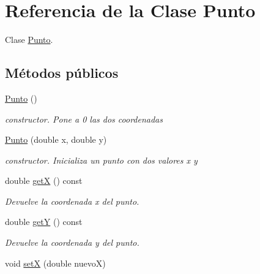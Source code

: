 \hypertarget{classPunto}{}\section{Referencia de la Clase Punto}
\label{classPunto}


Clase \hyperlink{classPunto}{Punto}.  


\subsection*{Métodos públicos}
\begin{DoxyCompactItemize}
\item 
\hyperlink{classPunto_a4b8b70b933ff13493ee5ddb3c8532c10}{Punto} ()\hypertarget{classPunto_a4b8b70b933ff13493ee5ddb3c8532c10}{}\label{classPunto_a4b8b70b933ff13493ee5ddb3c8532c10}

\begin{DoxyCompactList}\small\item\em constructor. Pone a 0 las dos coordenadas \end{DoxyCompactList}\item 
\hyperlink{classPunto_a911bb8d88eaa1f9904a27b0e159a51c0}{Punto} (double x, double y)\hypertarget{classPunto_a911bb8d88eaa1f9904a27b0e159a51c0}{}\label{classPunto_a911bb8d88eaa1f9904a27b0e159a51c0}

\begin{DoxyCompactList}\small\item\em constructor. Inicializa un punto con dos valores x y \end{DoxyCompactList}\item 
double \hyperlink{classPunto_aa218292fec9bad5ec6d71d4bd9173d9d}{getX} () const \hypertarget{classPunto_aa218292fec9bad5ec6d71d4bd9173d9d}{}\label{classPunto_aa218292fec9bad5ec6d71d4bd9173d9d}

\begin{DoxyCompactList}\small\item\em Devuelve la coordenada x del punto. \end{DoxyCompactList}\item 
double \hyperlink{classPunto_a214978b8bbae48ca5927f2e56fb3bd22}{getY} () const \hypertarget{classPunto_a214978b8bbae48ca5927f2e56fb3bd22}{}\label{classPunto_a214978b8bbae48ca5927f2e56fb3bd22}

\begin{DoxyCompactList}\small\item\em Devuelve la coordenada y del punto. \end{DoxyCompactList}\item 
void \hyperlink{classPunto_a51ae6616f828bb2b4111bc8ace49dbca}{setX} (double nuevoX)\hypertarget{classPunto_a51ae6616f828bb2b4111bc8ace49dbca}{}\label{classPunto_a51ae6616f828bb2b4111bc8ace49dbca}


\end{DoxyCompactItemize}
